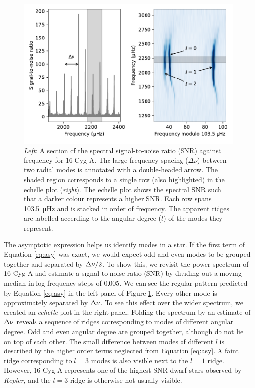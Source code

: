 \begin{figure}[tb]
    \centering
    \includegraphics{figures/seismo-echelle.pdf}
    \caption[Signal-to-noise ratio as a function of frequency and echelle diagram for 16 Cyg A.]{\emph{Left:} A section of the spectral signal-to-noise ratio (SNR) against frequency for 16 Cyg A. The large frequency spacing (\(\Delta\nu\)) between two radial modes is annotated with a double-headed arrow. The shaded region corresponds to a single row (also highlighted) in the echelle plot (\emph{right}). The echelle plot shows the spectral SNR such that a darker colour represents a higher SNR. Each row spans \SI{103.5}{\micro\hertz} and is stacked in order of frequency. The apparent ridges are labelled according to the angular degree (\(l\)) of the modes they represent.}
    \label{fig:seismo-echelle}
\end{figure}

The asymptotic expression helps us identify modes in a star. If the first term of Equation \ref{eq:asy} was exact, we would expect odd and even modes to be grouped together and separated by \({\Delta\nu}/2\). To show this, we revisit the power spectrum of 16 Cyg A and estimate a signal-to-noise ratio (SNR) by dividing out a moving median in log-frequency steps of \SI{0.005}{\dex}. We can see the regular pattern predicted by Equation \ref{eq:asy} in the left panel of Figure \ref{fig:seismo-echelle}. Every other mode is approximately separated by \({\Delta\nu}\). To see this effect over the wider spectrum, we created an \emph{echelle} plot in the right panel. Folding the spectrum by an estimate of \({\Delta\nu}\) reveals a sequence of ridges corresponding to modes of different angular degree. Odd and even angular degree are grouped together, although do not lie on top of each other. The small difference between modes of different \(l\) is described by the higher order terms neglected from Equation \ref{eq:asy}. A faint ridge corresponding to \(l=3\) modes is also visible next to the \(l=1\) ridge. However, 16 Cyg A represents one of the highest SNR dwarf stars observed by \emph{Kepler}, and the \(l=3\) ridge is otherwise not usually visible. 

